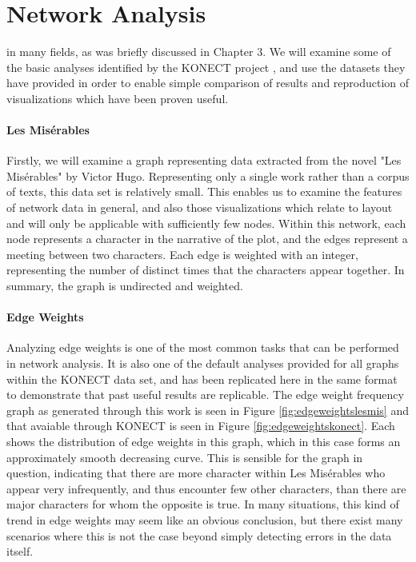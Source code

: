 \section{Network Analysis}
\label{sec:network}
 in many fields, as was briefly discussed in Chapter 3. We will examine some of the basic analyses identified by the KONECT project \citep{Kunegis2013}, and use the datasets they have provided in order to enable simple comparison of results and reproduction of visualizations which have been proven useful.

\paragraph{Les Misérables}
Firstly, we will examine a graph representing data extracted from the novel "Les Misérables" by Victor Hugo. Representing only a single work rather than a corpus of texts, this data set is relatively small. This enables us to examine the features of network data in general, and also those visualizations which relate to layout and will only be applicable with sufficiently few nodes. Within this network, each node represents a character in the narrative of the plot, and the edges represent a meeting between two characters. Each edge is weighted with an integer, representing the number of distinct times that the characters appear together. In summary, the graph is undirected and weighted.

\paragraph{Edge Weights}
Analyzing edge weights is one of the most common tasks that can be performed in network analysis. It is also one of the default analyses provided for all graphs within the KONECT data set, and has been replicated here in the same format to demonstrate that past useful results are replicable. The edge weight frequency graph as generated through this work is seen in Figure \ref{fig:edgeweightslesmis} and that avaiable through KONECT is seen in Figure \ref{fig:edgeweightskonect}. Each shows the distribution of edge weights in this graph, which in this case forms an approximately smooth decreasing curve. This is sensible for the graph in question, indicating that there are more character within Les Misérables who appear very infrequently, and thus encounter few other characters, than there are major characters for whom the opposite is true. In many situations, this kind of trend in edge weights may seem like an obvious conclusion, but there exist many scenarios where this is not the case beyond simply detecting errors in the data itself. 

